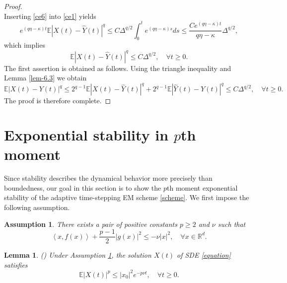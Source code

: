 \documentclass[preprint,12pt,compress]{elsarticle}
\newtheorem{lemma}[theorem]{Lemma}%
\newtheorem{assumption}[theorem]{Assumption}
\begin{document}
\begin{proof}
\begin{equation}
\end{equation} 
Inserting \eqref{ce6} into \eqref{ce1} yields
\begin{equation*}
	{e^{\left( {q\eta  - \kappa } \right)t}}\mathbb{E}{\left| {X(t) -  \hat Y(t)} \right|^q} \le C{\Delta ^{{q}/{2}}}\int_0^t {{e^{\left( {q\eta  - \kappa } \right)s}}ds} \le \frac{{C{e^{\left( {q\eta  - \kappa } \right)t}}}}{{q\eta  - \kappa }}{\Delta ^{{q}/{2}}},
\end{equation*} 
which implies
\begin{equation*}
	\mathbb{E}{\left| {X(t) -  \hat Y(t)} \right|^q} \le C\Delta^{{q}/{2}}, \quad \forall t \ge 0.
\end{equation*}
The first assertion is obtained as follows. Using the triangle inequality and Lemma \ref{lem-6.3} we obtain 
\begin{equation*}
	\mathbb{E}{\left| {X(t) -  Y(t)} \right|^q} \le {2^{q - 1}}\mathbb{E}{\left| {X(t) -  \hat Y(t)} \right|^q} + {2^{q - 1}}\mathbb{E}{\left| {\hat Y(t) - Y(t)} \right|^q} \le C\Delta^{{q}/{2}}, \quad \forall t\ge 0.
\end{equation*}
The proof is therefore complete.
\end{proof}

\section{Exponential stability in $p$th moment}  \label{sec7}
Since stability describes the dynamical behavior more precisely than boundedness, our goal in this section is to show the $p$th moment exponential stability of the adaptive time-stepping EM scheme \eqref{scheme}. We first impose the following assumption.

\begin{assumption}  \label{A6.1}
	There exists a pair of positive constants $p \ge 2$ and $\nu $ such that
	\begin{equation*}  
		\left\langle {x,f(x)} \right\rangle  + \frac{{p - 1}}{2}{\left| {g(x)} \right|^2} \le  - \nu {\left| x \right|^2},  \quad \forall x \in \mathbb{R}^d.
	\end{equation*}
\end{assumption}

\begin{lemma} (\cite[Theorem 4.4.4]{mao2008stochastic}) \label{lem-expon}
Under Assumption \ref{A6.1}, the solution $X(t)$ of SDE \eqref{equation} satisfies
\begin{equation*}
	\mathbb{E}{\left| {X(t)} \right|^p} \le {\left| {{x_0}} \right|^2}{e^{ - p\nu t}}, \quad \forall t\ge 0.
\end{equation*}
\end{lemma}
\end{document}
